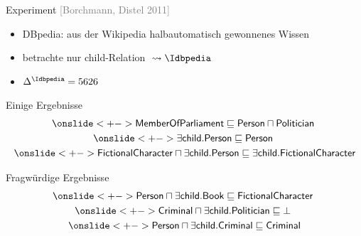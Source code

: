 \documentclass[ngerman]{beamer}
\newcommand{\pseudocite}[1]{\textcolor{gray}{[#1]}}
\begin{document}
\begin{frame}

  \onslide<+->
  
  \begin{block}{Experiment \pseudocite{Borchmann, Distel 2011}}
    \begin{itemize}
    \item<+-> DBpedia: aus der Wikipedia halbautomatisch gewonnenes Wissen
    \item<+-> betrachte nur \textsf{child}-Relation ${} \leadsto \Idbpedia$
    \item<+-> $\Delta^{\Idbpedia} = 5626$
    \end{itemize}
  \end{block}

  \onslide<+->

  \begin{block}{Einige Ergebnisse}
    \vspace*{-3ex}
    \begin{gather*}
      \onslide<+->{\sf MemberOfParliament \sqsubseteq Person \sqcap Politician}~\\
      \onslide<+->{\sf \exists child. Person \sqsubseteq Person}~\\
      \onslide<+->{\sf FictionalCharacter \sqcap \exists child. Person \sqsubseteq \exists
        child. FictionalCharacter}
    \end{gather*}
  \end{block}

  \onslide<+->

  \begin{block}{Fragwürdige Ergebnisse}
    \vspace*{-3ex}
    \begin{gather*}
      \onslide<+->{\sf Person \sqcap \exists child. Book \sqsubseteq
        FictionalCharacter}~\\
      \onslide<+->{\sf Criminal \sqcap \exists child. Politician \sqsubseteq \bot}~\\
      \onslide<+->{\sf Person \sqcap \exists child. Criminal \sqsubseteq Criminal}
    \end{gather*}
  \end{block}

\end{frame}
\end{document}

